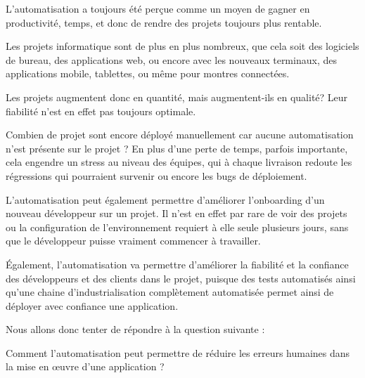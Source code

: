 \vfill


	L'automatisation a toujours été perçue comme un moyen de gagner en productivité, temps, et donc de rendre des projets toujours plus rentable.
	
	Les projets informatique sont de plus en plus nombreux, que cela soit des logiciels de bureau, des applications web, ou encore avec les nouveaux terminaux, des applications mobile, tablettes, ou même pour montres connectées.
	
	Les projets augmentent donc en quantité, mais augmentent-ils en qualité? Leur fiabilité n'est en effet pas toujours optimale. 
	
	Combien de projet sont encore déployé manuellement car aucune automatisation n'est présente sur le projet ? En plus d'une perte de temps, parfois importante, cela engendre un stress au niveau des équipes, qui à chaque livraison redoute les régressions qui pourraient survenir ou encore les bugs de déploiement.
	
	L'automatisation peut également permettre d'améliorer l'onboarding d'un nouveau développeur sur un projet. Il n'est en effet par rare de voir des projets ou la configuration de l'environnement requiert à elle seule plusieurs jours, sans que le développeur puisse vraiment commencer à travailler.
	
	Également, l'automatisation va permettre d'améliorer la fiabilité et la confiance des développeurs et des clients dans le projet, puisque des tests automatisés ainsi qu'une chaine d'industrialisation complètement automatisée permet ainsi de déployer avec confiance une application.
	
	Nous allons donc tenter de répondre à la question suivante : 
	
	Comment l'automatisation peut permettre de réduire les erreurs humaines dans la mise en œuvre d'une application ?
	
\vfill
